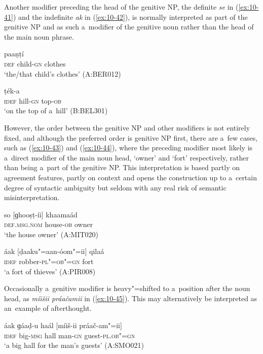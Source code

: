 Another modifier preceding the head of the genitive NP, the definite \textit{se} in (\ref{ex:10-41}) and the indefinite \textit{ak} in (\ref{ex:10-42}), is normally interpreted as part of the genitive NP and as such a~modifier of the genitive noun rather than the head of the main noun phrase.

\begin{exe}
\ex
\label{ex:10-41}
\gll [se kuṇaak-íi] paaṇṭí \\
\textsc{def} child-\textsc{gn} clothes  \\
\glt `the/that child's clothes' (A:BER012)

\ex
\label{ex:10-42}
\gll [ak táapeṛ-e] ṭék-a \\
\textsc{idef} hill-\textsc{gn} top-\textsc{ob}  \\
\glt `on the top of a~hill' (B:BEL301)
\end{exe}


However, the order between the genitive NP and other modifiers is not entirely fixed, and although the preferred order is genitive NP first, there are a~few cases, such as (\ref{ex:10-43}) and (\ref{ex:10-44}), where the preceding modifier most likely is a~direct modifier of the main noun head, `owner' and `fort' respectively, rather than being a~part of the genitive NP. This interpretation is based partly on agreement features, partly on context and opens the construction up to a~certain degree of syntactic ambiguity but seldom with any real risk of semantic misinterpretation.

\begin{exe}
\ex
\label{ex:10-43}
\gll so [ɡhooṣṭ-íi] khaamaád \\
\textsc{def.msg.nom} house-\textsc{ob} owner  \\
\glt `the house owner' (A:MIT020)

\ex
\label{ex:10-44}
\gll áak [ḍaaku"=aan-óom"=ii] qilaá  \\
\textsc{idef} robber-\textsc{pl"=ob"=gn} fort  \\
\glt `a fort of thieves' (A:PIR008)
\end{exe}


Occasionally a~genitive modifier is heavy"=shifted to a~position after the noun head, as \textit{míišii práačamii} in (\ref{ex:10-45}). This may alternatively be interpreted as an~example of afterthought.

\begin{exe}
\ex
\label{ex:10-45}
\gll áak ɡáaḍ-u haál [míiš-ii práač-am"=ii] \\
\textsc{idef} big-\textsc{msg} hall man-\textsc{gn} guest-\textsc{pl.ob"=gn}  \\
\glt `a big hall for the man's guests' (A:SMO021)
\end{exe}


